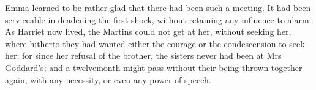 Emma learned to be rather glad that there had been such a meeting. It had been serviceable in deadening the first shock, without retaining any influence to alarm. As Harriet now lived, the Martins could not get at her, without seeking her, where hitherto they had wanted either the courage or the condescension to seek her; for since her refusal of the brother, the sisters never had been at Mrs Goddard's; and a twelvemonth might pass without their being thrown together again, with any necessity, or even any power of speech.